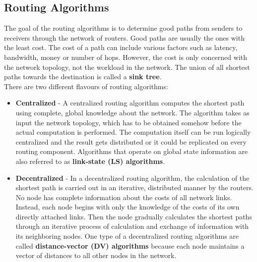 \subsection{Routing Algorithms}
The goal of the routing algorithms is to determine good paths from senders to receivers through the network of routers. Good paths are usually the ones with the least cost. The cost of a path can include various factors such as latency, bandwidth, money or number of hops. However, the cost is only concerned with the network topology, not the workload in the network. The union of all shortest paths towards the destination is called a \textbf{sink tree}.\\
There are two different flavours of routing algorithms:
\begin{itemize}
\item \textbf{Centralized} - A centralized routing algorithm computes the shortest path using complete, global knowledge about the network. The algorithm takes as input the network topology, which has to be obtained somehow before the actual computation is performed. The computation itself can be run logically centralized and the result gets distributed or it could be replicated on every routing component. Algorithms that operate on global state information are also referred to as \textbf{link-state (LS) algorithms}. 
\item \textbf{Decentralized} - In a decentralized routing algorithm, the calculation of the shortest path is carried out in an iterative, distributed manner by the routers. No node has complete information about the costs of all network links. Instead, each node begins with only the knowledge of the costs of its own directly attached links. Then the node gradually calculates the shortest paths through an iterative process of calculation and exchange of information with its neighboring nodes. One type of a decentralized routing algorithms are called \textbf{distance-vector (DV) algorithms} because each node maintains a vector of distances to all other nodes in the network.
\end{itemize}

